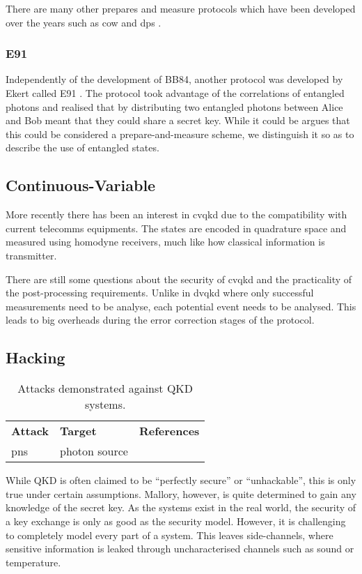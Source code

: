 There are many other prepares and measure protocols which have been developed over the years such as \ac{cow} \cite{COW-QKD} and \ac{dps} \cite{DPS-QKD}.

\subsubsection*{E91}

Independently of the development of BB84, another protocol was developed by Ekert called E91 \cite{E91}. The protocol took advantage of the correlations of entangled photons and realised that by distributing two entangled photons between Alice and Bob meant that they could share a secret key. While it could be argues that this could be considered a prepare-and-measure scheme, we distinguish it so as to describe the use of entangled states.

\subsection{Continuous-Variable}

More recently there has been an interest in \ac{cvqkd} due to the compatibility with current telecomms equipments. The states are encoded in quadrature space and measured using homodyne receivers, much like how classical information is transmitter.

There are still some questions about the security of \ac{cvqkd} and the practicality of the post-processing requirements. Unlike in \ac{dvqkd} where only successful measurements need to be analyse, each potential event needs to be analysed. This leads to big overheads during the error correction stages of the protocol.

\subsection{Hacking}

\begin{table}[t]
\centering
\begin{tabular}{lll}
	\textbf{Attack} & \textbf{Target} & \textbf{References}\\ 
	\Acl{pns} & photon source &
\end{tabular}
\caption[Attacks demonstrated against \acs{QKD} systems]{Attacks demonstrated against \acs{QKD} systems.}
\end{table}

While \ac{QKD} is often claimed to be ``perfectly secure'' or ``unhackable'', this is only true under certain assumptions.  Mallory, however, is quite determined to gain any knowledge of the secret key. As the systems exist in the real world, the security of a key exchange is only as good as the security model. However, it is challenging to completely model every part of a system. This leaves side-channels, where sensitive information is leaked through uncharacterised channels such as sound or temperature.

